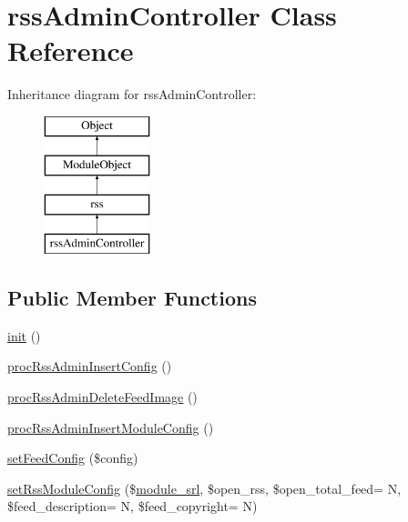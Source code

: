 \hypertarget{classrssAdminController}{}\section{rss\+Admin\+Controller Class Reference}
\label{classrssAdminController}
Inheritance diagram for rss\+Admin\+Controller\+:\begin{figure}[H]
\begin{center}
\leavevmode
\includegraphics[height=4.000000cm]{classrssAdminController}
\end{center}
\end{figure}
\subsection*{Public Member Functions}
\begin{DoxyCompactItemize}
\item 
\hyperlink{classrssAdminController_ad73e127c3d6191b7d82e2fd3f50ef477}{init} ()
\item 
\hyperlink{classrssAdminController_abacdc1717d07ac5cfe2d4bb83f08d310}{proc\+Rss\+Admin\+Insert\+Config} ()
\item 
\hyperlink{classrssAdminController_a37eed33f761ae0a1cdcce49562bed601}{proc\+Rss\+Admin\+Delete\+Feed\+Image} ()
\item 
\hyperlink{classrssAdminController_ae07c8748cdccb2d13dfb4140e9c13aeb}{proc\+Rss\+Admin\+Insert\+Module\+Config} ()
\item 
\hyperlink{classrssAdminController_a57c67e2413e7d6491f090975531094cd}{set\+Feed\+Config} (\$config)
\item 
\hyperlink{classrssAdminController_a4dfe5a37da285c2421b574923a5bcbf8}{set\+Rss\+Module\+Config} (\$\hyperlink{ko_8install_8php_a370bb6450fab1da3e0ed9f484a38b761}{module\+\_\+srl}, \$open\+\_\+rss, \$open\+\_\+total\+\_\+feed= \textquotesingle{}N\textquotesingle{}, \$feed\+\_\+description= \textquotesingle{}N\textquotesingle{}, \$feed\+\_\+copyright= \textquotesingle{}N\textquotesingle{})
\end{DoxyCompactItemize}
